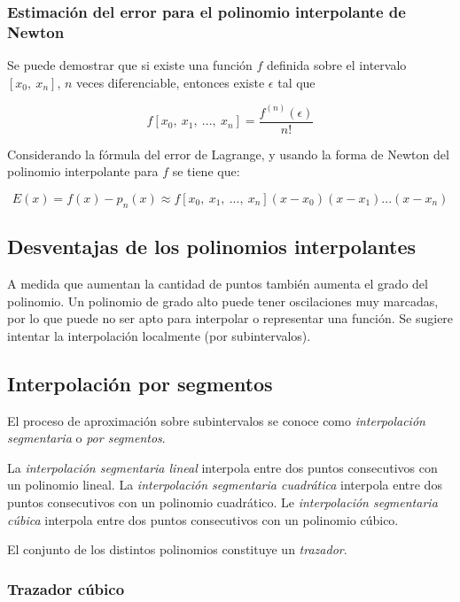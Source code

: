 \documentclass{article}
\begin{document}
\subsubsection{Estimación del error para el polinomio interpolante de Newton}

Se puede demostrar que si existe una función $f$ definida sobre el intervalo
$\left[x_0,\ x_n\right]$, $n$ veces diferenciable, entonces existe $\epsilon$ 
tal que

\[ f\left[x_0,\ x_1,\ ...,\ x_n\right] = \frac{f^{(n)}(\epsilon)}{n!} \]

Considerando la fórmula del error de Lagrange, y usando la forma de Newton
del polinomio interpolante para $f$ se tiene que:

\[ 
E(x) = f(x) - p_n(x) \approx 
f\left[x_0,\ x_1,\ ...,\ x_n\right](x-x_0)(x-x_1)...(x-x_n)
\]

\subsection{Desventajas de los polinomios interpolantes}

A medida que aumentan la cantidad de puntos también aumenta el grado del 
polinomio. Un polinomio de grado alto puede tener oscilaciones muy marcadas,
por lo que puede no ser apto para interpolar o representar una función. Se 
sugiere intentar la interpolación localmente (por subintervalos).

\subsection{Interpolación por segmentos}

El proceso de aproximación sobre subintervalos se conoce como 
\emph{interpolación segmentaria} o \emph{por segmentos}.

La \emph{interpolación segmentaria lineal} interpola entre dos puntos 
consecutivos con un polinomio lineal. La \emph{interpolación segmentaria 
cuadrática} interpola entre dos puntos consecutivos con un polinomio cuadrático.
Le \emph{interpolación segmentaria cúbica} interpola entre dos puntos 
consecutivos con un polinomio cúbico.

El conjunto de los distintos polinomios constituye un \emph{trazador}.

\subsubsection{Trazador cúbico}
\end{document}
